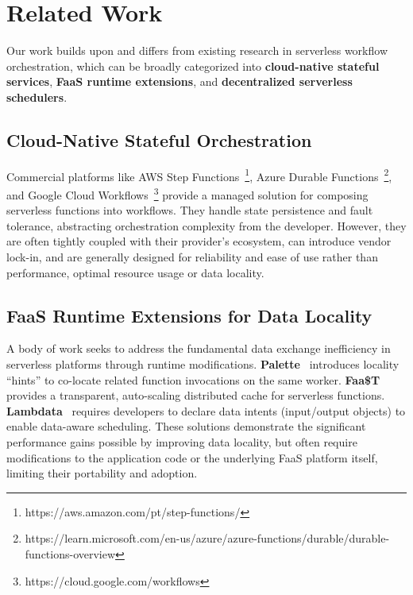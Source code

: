 \documentclass[conference]{IEEEtran}
\begin{document}

\section{Related Work}
\label{s:related_work}

Our work builds upon and differs from existing research in serverless workflow orchestration, which can be broadly categorized into \textbf{cloud-native stateful services}, \textbf{FaaS runtime extensions}, and \textbf{decentralized serverless schedulers}.

\subsection{Cloud-Native Stateful Orchestration}
Commercial platforms like AWS Step Functions~\footnote{https://aws.amazon.com/pt/step-functions/}, Azure Durable Functions~\footnote{https://learn.microsoft.com/en-us/azure/azure-functions/durable/durable-functions-overview}, and Google Cloud Workflows~\footnote{https://cloud.google.com/workflows} provide a managed solution for composing serverless functions into workflows. They handle state persistence and fault tolerance, abstracting orchestration complexity from the developer. However, they are often tightly coupled with their provider's ecosystem, can introduce vendor lock-in, and are generally designed for reliability and ease of use rather than performance, optimal resource usage or data locality.

\subsection{FaaS Runtime Extensions for Data Locality}
A body of work seeks to address the fundamental data exchange inefficiency in serverless platforms through runtime modifications. \textbf{Palette}~\cite{palette_load_balancing} introduces locality ``hints'' to co-locate related function invocations on the same worker. \textbf{Faa\$T}~\cite{faast_caching} provides a transparent, auto-scaling distributed cache for serverless functions. \textbf{Lambdata}~\cite{lambdata_intents} requires developers to declare data intents (input/output objects) to enable data-aware scheduling. These solutions demonstrate the significant performance gains possible by improving data locality, but often require modifications to the application code or the underlying FaaS platform itself, limiting their portability and adoption.
\end{document}
